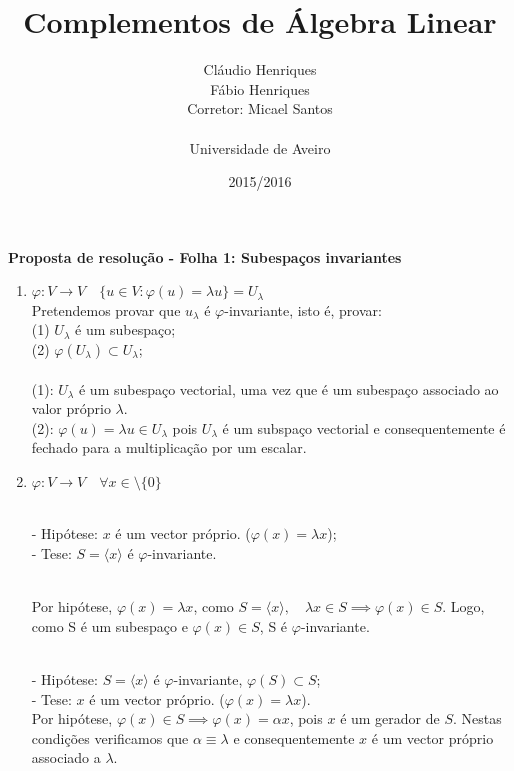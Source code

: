 \documentclass[a4paper, twoside,11pt]{report}
\title{Complementos de Álgebra Linear}
\author{Cláudio Henriques
\\Fábio Henriques
\\Corretor: Micael Santos
\\
\\Universidade de Aveiro}
\date{2015/2016}
\begin{document}
\maketitle

\large\textbf{Proposta de resolução - Folha 1: Subespaços invariantes}
\vskip 0.25in
\makelettertitle

\begin{enumerate}

\item $\varphi \colon V \to V \quad \{ u\in V\colon\varphi(u)=\lambda u\} = U_\lambda$
\\Pretendemos provar que $u_\lambda$ é $\varphi$-invariante, isto é, provar:
\\(1) $U_\lambda$ é um subespaço; 
\\(2) $\varphi(U_\lambda)\subset U_\lambda$; 
\\ 
\\ (1): $U_\lambda$ é um subespaço vectorial, uma vez que é um subespaço associado ao valor próprio $ \lambda$. 
\\ (2): $\varphi(u) = \lambda u \in U_\lambda$ pois $U_\lambda$ é um subspaço vectorial e consequentemente é fechado para a multiplicação por um escalar.

\vskip 0.25in

\item $\varphi\colon V \to V \quad \forall x\in\setminus\{0\}$

\\- Hipótese: $x$ é um vector próprio. ($\varphi (x) = \lambda x$);
\\- Tese: $S=\langle x \rangle $ é $\varphi$-invariante.

\\ Por hipótese, $ \varphi (x)=\lambda x $, como $ S = \langle x \rangle,\quad \lambda x \in S \implies \varphi (x) \in S$. Logo, como S é um subespaço e $ \varphi(x) \in S$, S é $ \varphi$-invariante.

\\- Hipótese: $S=\langle x \rangle $ é $\varphi$-invariante, $ \varphi (S) \subset S$;
\\- Tese: $x$ é um vector próprio. ($\varphi (x) = \lambda x$).
\\Por hipótese, $ \varphi (x) \in S \implies \varphi (x) = \alpha x $, pois $x$ é um gerador de $S$. Nestas condições verificamos que $ \alpha \equiv \lambda$ e consequentemente $x$ é um vector próprio associado a $\lambda$. 


\end{enumerate}
\end{document}
